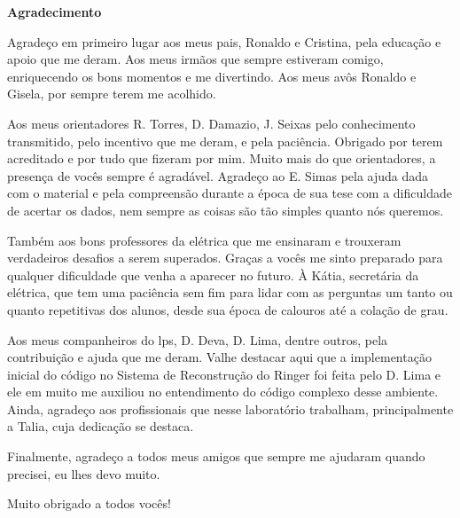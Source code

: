 \cleardoublepage

\begin{center}
\textbf{\Large Agradecimento}
\end{center}

Agradeço em primeiro lugar aos meus pais, Ronaldo e Cristina, 
pela educação e apoio que me deram. Aos meus irmãos que sempre
estiveram comigo, enriquecendo os bons momentos e me divertindo. Aos meus 
avôs Ronaldo e Gisela, por sempre terem me acolhido.

Aos meus orientadores R. Torres, D. Damazio, J. Seixas pelo conhecimento
transmitido, pelo incentivo que me deram, e pela paciência. Obrigado 
por terem acreditado e por tudo que fizeram por mim. Muito mais do que
orientadores, a presença de vocês sempre é agradável. Agradeço ao E. Simas pela
ajuda dada com o material e pela compreensão durante a época de sua tese com a
dificuldade de acertar os dados, nem sempre as coisas são tão simples quanto nós
queremos.

Também aos bons professores da elétrica que me ensinaram e trouxeram 
verdadeiros desafios a serem superados. Graças a vocês me sinto preparado para
qualquer dificuldade que venha a aparecer no futuro.
À Kátia, secretária da elétrica, que tem uma paciência sem fim para lidar com as
perguntas um tanto ou quanto repetitivas dos alunos, desde sua época de calouros
até a colação de grau. 


Aos meus companheiros do \acrshort{lps}, D. Deva, D. Lima, 
dentre outros, pela contribuição e ajuda que me deram. Valhe destacar aqui que a
implementação inicial do código no Sistema de Reconstrução do Ringer foi feita pelo D. Lima
e ele em muito me auxiliou no entendimento do código complexo desse ambiente. 
Ainda, agradeço aos profissionais que nesse 
laboratório trabalham, principalmente a Talia, cuja dedicação se destaca.

Finalmente, agradeço a todos meus amigos que sempre me ajudaram quando precisei, 
eu lhes devo muito.

Muito obrigado a todos vocês!
